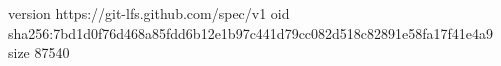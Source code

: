 version https://git-lfs.github.com/spec/v1
oid sha256:7bd1d0f76d468a85fdd6b12e1b97c441d79cc082d518c82891e58fa17f41e4a9
size 87540
